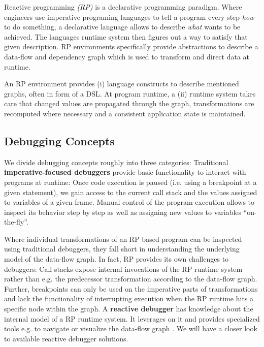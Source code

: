 \documentclass[12pt,a4paper]{article}
\begin{document}
Reactive programming \emph{(RP)} is a declarative programming paradigm. Where engineers use imperative programing languages to tell a program every step \emph{how} to do something, a declarative language allows to describe \emph{what} wants to be achieved. The languages runtime system then figures out a way to satisfy that given description. RP environments specifically provide abstractions to describe a data-flow and dependency graph which is used to transform and direct data at runtime.

An RP environment provides (i) language constructs to describe mentioned graphs, often in form of a DSL\cite{10.1145/2577080.2577083}. At program runtime, a (ii) runtime system takes care that changed values are propagated through the graph, transformations are recomputed where necessary and a consistent application state is maintained.

\subsection{Debugging Concepts}

We divide debugging concepts roughly into three categories: Traditional \textbf{imperative-focused debuggers} provide basic functionality to interact with programs at runtime: Once code execution is paused (i.e. using a breakpoint at a given statement), we gain access to the current call stack and the values assigned to variables of a given frame. Manual control of the program execution allows to inspect its behavior step by step as well as assigning new values to variables ``on-the-fly''.

Where individual transformations of an RP based program can be inspected using traditional debuggers, they fall short in understanding the underlying model of the data-flow graph. In fact, RP provides its own challenges to debuggers: Call stacks expose internal invocations of the RP runtime system rather than e.g. the predecessor transformation according to the data-flow graph. Further, breakpoints can only be used on the imperative parts of transformations and lack the functionality of interrupting execution when the RP runtime hits a specific node within the graph. A \textbf{reactive debugger} has knowledge about the internal model of a RP runtime system. It leverages on it and provides specialized tools e.g. to navigate or visualize the data-flow graph \cite{10.1145/2884781.2884815} \cite{10.1145/3180155.3180156} \cite{rxviz}. We will have a closer look to available reactive debugger solutions.
\end{document}
